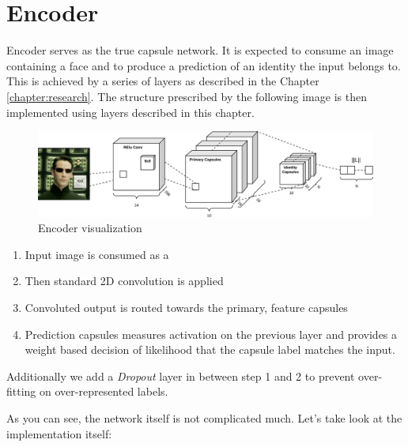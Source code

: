 \section{Encoder}

Encoder serves as the true capsule network. It is expected to consume an image containing a face and to produce a prediction of an identity the input belongs to. This is achieved by a series of layers as described in the Chapter\,\ref{chapter:research}. The structure prescribed by the following image is then implemented using layers described in this chapter.

\begin{figure}[ht!]
    \centering
    \includegraphics[width=\textwidth]{obrazky-figures/my_capsnet_encoder.pdf}
    \caption{Encoder visualization}
    \label{fig:my_encoder}
\end{figure}

\begin{enumerate}
    \item Input image is consumed as a
    \item Then standard 2D convolution is applied
    \item Convoluted output is routed towards the primary, feature capsules
    \item Prediction capsules measures activation on the previous layer and provides a weight based decision of likelihood that the capsule label matches the input.
\end{enumerate}

Additionally we add a \textit{Dropout} layer in between step 1 and 2 to prevent over-fitting on over-represented labels.

As you can see, the network itself is not complicated much. Let's take look at the implementation itself:

